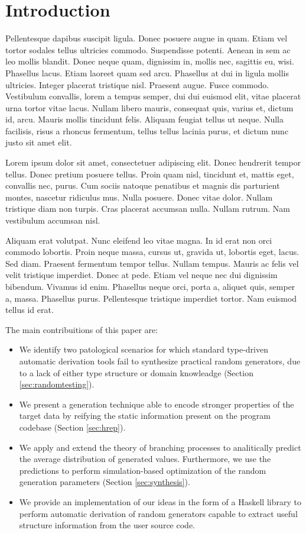 \section{Introduction}

Pellentesque dapibus suscipit ligula. Donec posuere augue in quam. Etiam vel
tortor sodales tellus ultricies commodo. Suspendisse potenti. Aenean in sem ac
leo mollis blandit. Donec neque quam, dignissim in, mollis nec, sagittis eu,
wisi. Phasellus lacus. Etiam laoreet quam sed arcu. Phasellus at dui in ligula
mollis ultricies. Integer placerat tristique nisl. Praesent augue. Fusce
commodo. Vestibulum convallis, lorem a tempus semper, dui dui euismod elit,
vitae placerat urna tortor vitae lacus. Nullam libero mauris, consequat quis,
varius et, dictum id, arcu. Mauris mollis tincidunt felis. Aliquam feugiat
tellus ut neque. Nulla facilisis, risus a rhoncus fermentum, tellus tellus
lacinia purus, et dictum nunc justo sit amet elit.

Lorem ipsum dolor sit amet, consectetuer adipiscing elit. Donec hendrerit tempor
tellus. Donec pretium posuere tellus. Proin quam nisl, tincidunt et, mattis
eget, convallis nec, purus. Cum sociis natoque penatibus et magnis dis
parturient montes, nascetur ridiculus mus. Nulla posuere. Donec vitae dolor.
Nullam tristique diam non turpis. Cras placerat accumsan nulla. Nullam rutrum.
Nam vestibulum accumsan nisl.

Aliquam erat volutpat. Nunc eleifend leo vitae magna. In id erat non orci
commodo lobortis. Proin neque massa, cursus ut, gravida ut, lobortis eget,
lacus. Sed diam. Praesent fermentum tempor tellus. Nullam tempus. Mauris ac
felis vel velit tristique imperdiet. Donec at pede. Etiam vel neque nec dui
dignissim bibendum. Vivamus id enim. Phasellus neque orci, porta a, aliquet
quis, semper a, massa. Phasellus purus. Pellentesque tristique imperdiet tortor.
Nam euismod tellus id erat\cite{grieco2017}.

The main contribuitions of this paper are:
%
\begin{itemize}
\item We identify two patological scenarios for which standard type-driven
  automatic derivation tools fail to synthesize practical random generators, due
  to a lack of either type structure or domain knowleadge (Section
  \ref{sec:randomtesting}).
\item We present a generation technique able to encode stronger properties of
  the target data by reifying the static information present on the program
  codebase (Section \ref{sec:hrep}).
\item We apply and extend the theory of branching processes to analitically
  predict the average distribution of generated values.
  Furthermore, we use the predictions to perform simulation-based optimization
  of the random generation parameters (Section \ref{sec:synthesis}).
\item We provide an implementation of our ideas in the form of a Haskell library
  to perform automatic derivation of random generators capable to extract
  useful structure information from the user source code.
\end{itemize}